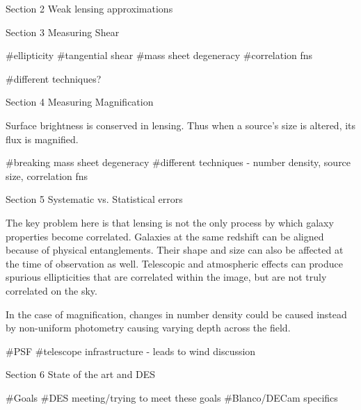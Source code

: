 Section 2
Weak lensing approximations


Section 3
Measuring Shear

#ellipticity
#tangential shear
#mass sheet degeneracy
#correlation fns

#different techniques? 

Section 4
Measuring Magnification

Surface brightness is conserved in lensing. Thus when a source's size is altered, its flux is magnified.

#breaking mass sheet degeneracy
#different techniques - number density, source size, correlation fns

Section 5
Systematic vs. Statistical errors

The key problem here is that lensing is not the only process by which galaxy properties become correlated. Galaxies at the same redshift can be aligned because of physical entanglements. Their shape and size can also be affected at the time of observation as well. Telescopic and atmospheric effects can produce spurious ellipticities that are correlated within the image, but are not truly correlated on the sky.

In the case of magnification, changes in number density could be caused instead by non-uniform photometry causing varying depth across the field. 

#PSF
#telescope infrastructure - leads to wind discussion


Section 6
State of the art and DES

#Goals
#DES meeting/trying to meet these goals
#Blanco/DECam specifics
